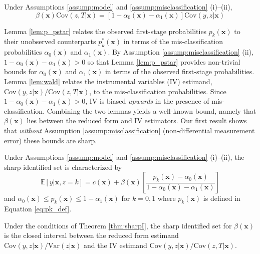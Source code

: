 \begin{lem}
  \label{lem:wald}
  Under Assumptions \ref{assump:model} and \ref{assump:misclassification} (i)--(ii), $$\beta(\mathbf{x}) \mbox{Cov}(z,T|\mathbf{x}) = \left[ 1 - \alpha_0(\mathbf{x}) - \alpha_1(\mathbf{x}) \right]\mbox{Cov}(y,z|\mathbf{x})$$
\end{lem}

Lemma \ref{lem:p_pstar} relates the observed first-stage probabilities $p_k(\mathbf{x})$ to their unobserved counterparts $p^*_k(\mathbf{x})$ in terms of the mis-classification probabilities $\alpha_0(\mathbf{x})$ and $\alpha_1(\mathbf{x})$.
By Assumption \ref{assump:misclassification} (ii), $1 - \alpha_0(\mathbf{x}) - \alpha_1(\mathbf{x}) > 0$ so that Lemma \ref{lem:p_pstar} provides non-trivial bounds for $\alpha_0(\mathbf{x})$ and $\alpha_1(\mathbf{x})$ in terms of the observed first-stage probabilities.
Lemma \ref{lem:wald} relates the instrumental variables (IV) estimand, $\mbox{Cov}(y,z|\mathbf{x})/\mbox{Cov}(z,T|\mathbf{x})$, to the mis-classification probabilities.
Since $1 - \alpha_0(\mathbf{x}) - \alpha_1(\mathbf{x}) > 0$, IV is biased \emph{upwards} in the presence of mis-classification.
Combining the two lemmas yields a well-known bound, namely that $\beta(\mathbf{x})$ lies between the reduced form and IV estimators.
Our first result shows that \emph{without} Assumption \ref{assump:misclassification} (non-differential measurement error) these bounds are sharp.

\begin{thm}
  Under Assumptions \ref{assump:model} and \ref{assump:misclassification} (i)--(ii), the sharp identified set is characterized by 
  \begin{equation}
    \mathbb{E}[y|\mathbf{x},z=k] = c(\mathbf{x}) + \beta(\mathbf{x}) \left[\frac{p_k(\mathbf{x}) - \alpha_0(\mathbf{x})}{1 - \alpha_0(\mathbf{x}) - \alpha_1(\mathbf{x})}\right]
    \label{eq:identsetI}
  \end{equation}
and $\alpha_0(\mathbf{x}) \leq p_k(\mathbf{x}) \leq 1 -  \alpha_1(\mathbf{x})$ for  $k = 0, 1$ where $p_k(\mathbf{x})$ is defined in Equation \ref{eq:pk_def}.
  \label{thm:sharpI}
\end{thm}

\begin{cor}
  Under the conditions of Theorem \ref{thm:sharpI}, the sharp identified set for $\beta(\mathbf{x})$ is the closed interval between the reduced form estimand $\mbox{Cov}(y,z|\mathbf{x})/\mbox{Var}(z|\mathbf{x})$ and the IV estimand $\mbox{Cov}(y,z|\mathbf{x})/\mbox{Cov}(z,T|\mathbf{x})$.
\label{cor:sharpBeta1}
\end{cor}


